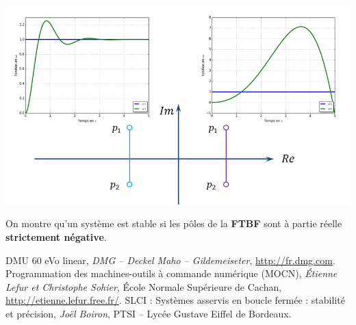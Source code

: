 \documentclass[10pt,oneside]{article}
\begin{document}
\begin{center}
 \includegraphics[width=.8\textwidth]{png/poles_3}
\end{center}


\begin{resultat}
On montre qu'un système est stable si les pôles de la \textbf{FTBF} sont à partie réelle \textbf{strictement négative}.
\end{resultat}

\begin{thebibliography}{2}
    DMU 60 eVo linear, \textit{DMG -- Deckel Maho -- Gildemeiseter}, \url{http://fr.dmg.com}.
    Programmation des machines-outils à commande numérique (MOCN), \textit{Étienne Lefur et Christophe Sohier}, École Normale Supérieure de Cachan, \url{http://etienne.lefur.free.fr/}.
    SLCI : Systèmes asservis en boucle fermée : stabilité et précision, \textit{Joël Boiron}, PTSI -- Lycée Gustave Eiffel de Bordeaux.

\end{thebibliography}
\end{document}
